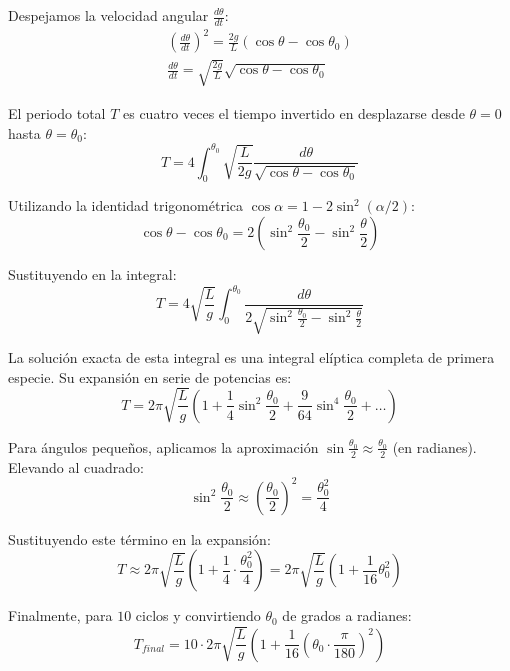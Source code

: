 \documentclass[11pt]{article}
\begin{document}
		Despejamos la velocidad angular $\frac{d\theta}{dt}$:
		\begin{gather*}
			\left( \frac{d\theta}{dt} \right)^2 = \frac{2g}{L} (\cos\theta - \cos\theta_0)
			\\
			\frac{d\theta}{dt} = \sqrt{\frac{2g}{L}} \sqrt{\cos\theta - \cos\theta_0}
		\end{gather*}
		
		El periodo total $T$ es cuatro veces el tiempo invertido en desplazarse desde $\theta = 0$ hasta $\theta = \theta_0$:
		\begin{equation*}
			T = 4 \int_{0}^{\theta_0} \sqrt{\frac{L}{2g}} \frac{d\theta}{\sqrt{\cos\theta - \cos\theta_0}}
		\end{equation*}
		
		Utilizando la identidad trigonométrica $\cos\alpha = 1 - 2\sin^2(\alpha/2)$:
		\begin{equation*}
			\cos\theta - \cos\theta_0 = 2 \left( \sin^2\frac{\theta_0}{2} - \sin^2\frac{\theta}{2} \right)
		\end{equation*}
		
		Sustituyendo en la integral:
		\begin{equation*}
			T = 4\sqrt{\frac{L}{g}} \int_{0}^{\theta_0} \frac{d\theta}{2\sqrt{\sin^2\frac{\theta_0}{2} - \sin^2\frac{\theta}{2}}}
		\end{equation*}
		
		La solución exacta de esta integral es una integral elíptica completa de primera especie. Su expansión en serie de potencias es:
		\begin{equation*}
			T = 2\pi\sqrt{\frac{L}{g}} \left( 1 + \frac{1}{4}\sin^2\frac{\theta_0}{2} + \frac{9}{64}\sin^4\frac{\theta_0}{2} + \dots \right)
		\end{equation*}
		
		Para ángulos pequeños, aplicamos la aproximación $\sin\frac{\theta_0}{2} \approx \frac{\theta_0}{2}$ (en radianes). Elevando al cuadrado:
		\begin{equation}
			\sin^2\frac{\theta_0}{2} \approx \left( \frac{\theta_0}{2} \right)^2 = \frac{\theta_0^2}{4}
		\end{equation}
		
		Sustituyendo este término en la expansión:
		\begin{equation}
			T \approx 2\pi\sqrt{\frac{L}{g}} \left( 1 + \frac{1}{4} \cdot \frac{\theta_0^2}{4} \right) = 2\pi\sqrt{\frac{L}{g}} \left( 1 + \frac{1}{16}\theta_0^2 \right)
		\end{equation}
		
		Finalmente, para $10$ ciclos y convirtiendo $\theta_0$ de grados a radianes:
		\begin{equation}
			\boxed{T_{final} = 10 \cdot 2\pi\sqrt{\frac{L}{g}} \left( 1 + \frac{1}{16} \left( \theta_0 \cdot \frac{\pi}{180} \right)^2 \right)}
		\end{equation}
		
		\renewcommand{\refname}{Bibliografía}
		
\end{document}
